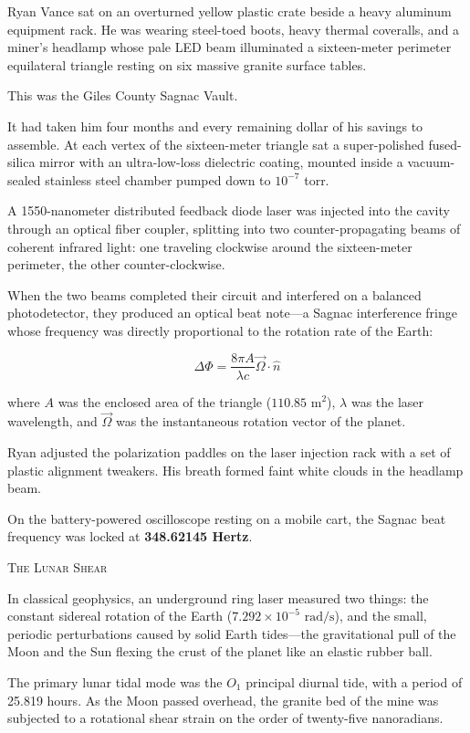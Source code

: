 \documentclass[12pt,twoside,openright]{book}
\newcommand{\sceneheader}[1]{%
  \par\vspace{1.8em}%
  {\noindent\centering\scshape\large #1\par}%
  \vspace{1.0em}%
  \noindent%
}
\newcommand{\dinkus}{%
  \par\vspace{1.2em}%
  {\noindent\centering{\large $\ast\quad\ast\quad\ast$}\par}%
  \vspace{1.2em}%
  \noindent%
}
\begin{document}
Ryan Vance sat on an overturned yellow plastic crate beside a heavy
aluminum equipment rack. He was wearing steel-toed boots, heavy thermal
coveralls, and a miner's headlamp whose pale LED beam illuminated a
sixteen-meter perimeter equilateral triangle resting on six massive
granite surface tables.

This was the Giles County Sagnac Vault.

It had taken him four months and every remaining dollar of his savings
to assemble. At each vertex of the sixteen-meter triangle sat a
super-polished fused-silica mirror with an ultra-low-loss dielectric
coating, mounted inside a vacuum-sealed stainless steel chamber pumped
down to \(10^{-7}\) torr.

A 1550-nanometer distributed feedback diode laser was injected into the
cavity through an optical fiber coupler, splitting into two
counter-propagating beams of coherent infrared light: one traveling
clockwise around the sixteen-meter perimeter, the other
counter-clockwise.

When the two beams completed their circuit and interfered on a balanced
photodetector, they produced an optical beat note---a Sagnac
interference fringe whose frequency was directly proportional to the
rotation rate of the Earth:

\[\Delta \Phi = \frac{8 \pi A}{\lambda c} \vec{\Omega} \cdot \hat{n}\]

where \(A\) was the enclosed area of the triangle
(\(110.85\text{ m}^2\)), \(\lambda\) was the laser wavelength, and
\(\vec{\Omega}\) was the instantaneous rotation vector of the planet.

Ryan adjusted the polarization paddles on the laser injection rack with
a set of plastic alignment tweakers. His breath formed faint white
clouds in the headlamp beam.

On the battery-powered oscilloscope resting on a mobile cart, the Sagnac
beat frequency was locked at \textbf{348.62145 Hertz}.

\dinkus

\sceneheader{The Lunar Shear}

In classical geophysics, an underground ring laser measured two things:
the constant sidereal rotation of the Earth
(\(7.292 \times 10^{-5}\text{ rad/s}\)), and the small, periodic
perturbations caused by solid Earth tides---the gravitational pull of
the Moon and the Sun flexing the crust of the planet like an elastic
rubber ball.

The primary lunar tidal mode was the \(O_1\) principal diurnal tide,
with a period of 25.819 hours. As the Moon passed overhead, the granite
bed of the mine was subjected to a rotational shear strain on the order
of twenty-five nanoradians.
\end{document}
